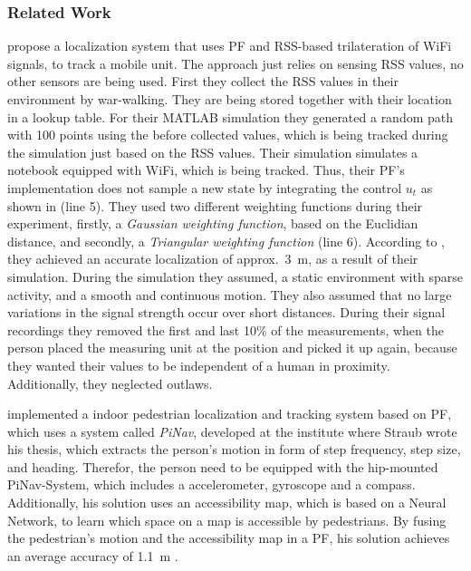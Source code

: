 \subsubsection*{Related Work}

\citet{Siddiqui:tracking} propose a localization system that uses \acs{PF} and \acs{RSS}-based trilateration of WiFi signals, to track a mobile unit. The approach just relies on sensing \acs{RSS} values, no other sensors are being used. First they collect the \acs{RSS} values in their environment by war-walking. They are being stored together with their location in a lookup table. For their MATLAB simulation they generated a random path with 100 points using the before collected values, which is being tracked during the simulation just based on the \acs{RSS} values. Their simulation simulates a notebook equipped with WiFi, which is being tracked. Thus, their \acs{PF}'s implementation does not sample a new state by integrating the control $u_t$ as shown in (line 5). They used two different weighting functions during their experiment, firstly, a \emph{Gaussian weighting function}, based on the Euclidian distance, and secondly, a \emph{Triangular weighting function} (line 6). According to \citet{Siddiqui:tracking}, they achieved an accurate localization of approx.\ 3~m, as a result of their simulation. During the simulation they assumed, a static environment with sparse activity, and a smooth and continuous motion. They also assumed that no large variations in the signal strength occur over short distances. During their signal recordings they removed the first and last 10\% of the measurements, when the person placed the measuring unit at the position and picked it up again, because they wanted their values to be independent of a human in proximity. Additionally, they neglected outlaws.

\citet{straub:pf} implemented a indoor pedestrian localization and tracking system based on \acs{PF}, which uses a system called \emph{PiNav}, developed at the institute where Straub wrote his thesis, which extracts the person's motion in form of step frequency, step size, and heading. Therefor, the person need to be equipped with the hip-mounted PiNav-System, which includes a accelerometer, gyroscope and a compass. Additionally, his solution uses an accessibility map, which is based on a Neural Network, to learn which space on a map is accessible by pedestrians. By fusing the pedestrian's motion and the accessibility map in a \acs{PF}, his solution achieves an average accuracy of 1.1~m \citep{straub:pf}.


